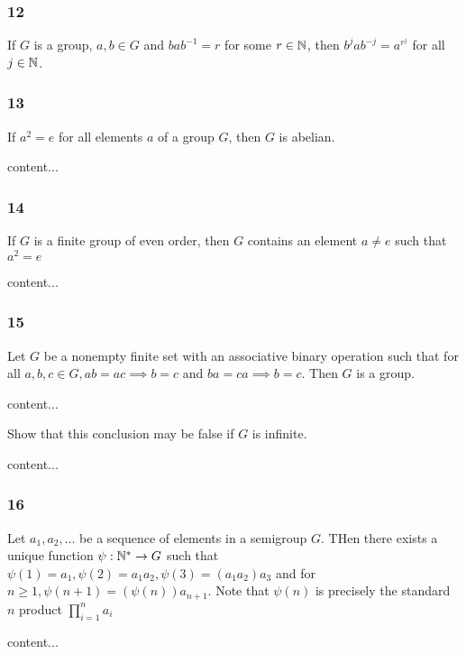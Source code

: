 \subsubsection*{12}
\begin{graybox}
	If $G$ is a group, $a, b\in G$ and $bab^{-1} = r$ for some $r \in \mathbb{N}$, then $b^jab^{-j} = a^{r^j}$ for all $j \in \mathbb{N}$.
\end{graybox}

\subsubsection*{13}
\begin{graybox}
	If $a^2 = e$ for all elements $a$ of a group $G$, then $G$ is abelian.
\end{graybox}
\begin{solution}
	content...
\end{solution}

\subsubsection*{14}
\begin{graybox}
	If $G$ is a finite group of even order, then $G$ contains an element $a \neq e$ such that $a^2 = e$
\end{graybox}
\begin{solution}
	content...
\end{solution}

\subsubsection*{15}
\begin{graybox}
	Let $G$ be a nonempty finite set with an associative binary operation such that for all $a,b,c \in G, ab = ac \implies b = c$ and $ba = ca \implies b = c$. Then $G$ is a group. 
\end{graybox}
\begin{solution}
	content...
\end{solution}
\begin{lightgraybox}
	Show that this conclusion may be false if $G$ is infinite.
\end{lightgraybox}
\begin{solution}
	content...
\end{solution}

\subsubsection*{16}
\begin{graybox}
	Let $a_1, a_2,\dots$ be a sequence of elements in a semigroup $G$. THen there exists a unique function $\psi : \mathbb{N}^* \to G$ such that $\psi(1) = a_1, \psi(2) = a_1a_2, \psi(3) = (a_1a_2)a_3$ and for $n\geq 1, \psi(n + 1) = (\psi(n))a_{n+1}$. Note that $\psi(n)$ is precisely the standard $n$ product $\prod_{i=1}^na_i$
\end{graybox}
\begin{solution}
	content...
\end{solution}